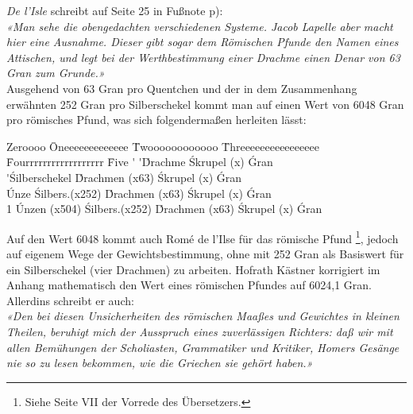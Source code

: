 \documentclass[a5paper,fontsize=10pt]{memoir}
\newcommand\gransofquentins{63}
\begin{document}
\emph{De l'Isle} schreibt auf Seite 25 in Fußnote p):\\

\emph{«Man sehe die obengedachten verschiedenen Systeme.
Jacob Lapelle aber macht hier eine Ausnahme.
Dieser gibt sogar dem Römischen Pfunde den Namen eines Attischen,
und legt bei der Werthbestimmung einer Drachme
einen Denar von 63 Gran zum Grunde.»}\\

Ausgehend von 63 Gran pro Quentchen
und der in dem Zusammenhang erwähnten 252 Gran pro Silberschekel
kommt man auf einen Wert von 6048 Gran pro römisches Pfund,
was sich folgendermaßen herleiten lässt:\\

\noindent
\begin{minipage}{\linewidth}
\footnotesize
\FPeval{} %
\begin{tabbing}
Zeroooo  \= Oneeeeeeeeeeeee \= Twoooooooooooo    \= Threeeeeeeeeeeeeeee \= Fourrrrrrrrrrrrrrrrrr \= Five      \kill
         \>  \'             \>  \'               \'Drachme          \'Skrupel (x\scruplesofquentins)    \'Gran \\
         \>  \'             \'Silberschekel  \'Drachmen (x\gransofquentins)   \'Skrupel (x\scruplesofquentins)    \'Gran \\
         \'Unze         \'Silbers.(x252) \'Drachmen (x\gransofquentins)   \'Skrupel (x\scruplesofquentins)    \'Gran \\
1 \Pfund {}\'Unzen (x504) \'Silbers.(x252) \'Drachmen (x\gransofquentins)   \'Skrupel (x\scruplesofquentins)    \'Gran \\
\end{tabbing}
\end{minipage}

Auf den Wert 6048 kommt auch  Romé de l'Ilse
für das römische Pfund%
\footnote{Siehe Seite VII der Vorrede des Übersetzers.},
jedoch auf eigenem Wege der Gewichtsbestimmung,
ohne mit 252 Gran als Basiswert
für ein Silberschekel (vier Drachmen) zu arbeiten.
Hofrath Kästner korrigiert im Anhang mathematisch
den Wert eines römischen Pfundes auf 6024,1 Gran.
Allerdins schreibt er auch:\\

\emph{«Den bei diesen Unsicherheiten des römischen Maaßes
und Gewichtes in kleinen Theilen,
beruhigt mich der Ausspruch eines zuverlässigen Richters:
daß wir mit allen Bemühungen der Scholiasten, Grammatiker und Kritiker,
Homers Gesänge nie so zu lesen bekommen,
wie die Griechen sie gehört haben.»}\\
\end{document}
